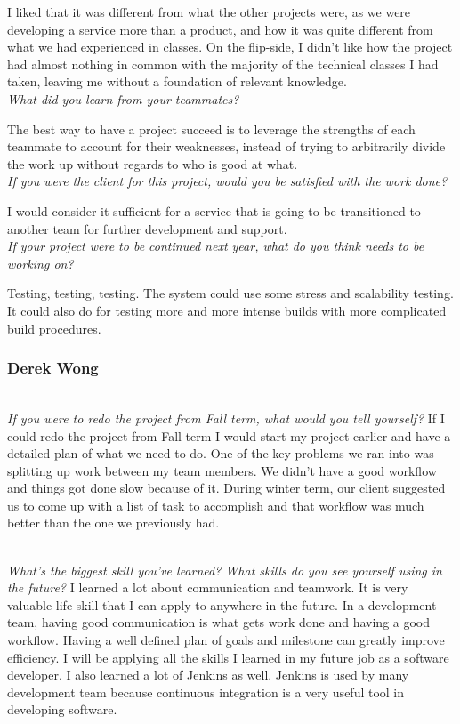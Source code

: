 \documentclass[10pt,letterpaper,onecolumn,draftclsnofoot]{IEEEtran}
\begin{document}
I liked that it was different from what the other projects were, as we were developing a service more than a product, and how it was quite different from what we had experienced in classes. On the flip-side, I didn't like how the project had almost nothing in common with the majority of the technical classes I had taken, leaving me without a foundation of relevant knowledge.
\textit{\\What did you learn from your teammates?}

The best way to have a project succeed is to leverage the strengths of each teammate to account for their weaknesses, instead of trying to arbitrarily divide the work up without regards to who is good at what.
\textit{\\If you were the client for this project, would you be satisfied with the work done?}

I would consider it sufficient for a service that is going to be transitioned to another team for further development and support.
\textit{\\If your project were to be continued next year, what do you think needs to be working on?}

Testing, testing, testing. The system could use some stress and scalability testing. It could also do for testing more and more intense builds with more complicated build procedures.\\

\subsubsection{Derek Wong}
\textit{\\If you were to redo the project from Fall term, what would you tell yourself?}
If I could redo the project from Fall term I would start my project earlier and have a detailed plan of what we need to do. One of the key problems we ran into was splitting up work between my team members. We didn't have a good workflow and things got done slow because of it. During winter term, our client suggested us to come up with a list of task to accomplish and that workflow was much better than the one we previously had.

\textit{\\What's the biggest skill you've learned? What skills do you see yourself using in the future?}
I learned a lot about communication and teamwork. It is very valuable life skill that I can apply to anywhere in the future. In a development team, having good communication is what gets work done and having a good workflow. Having a well defined plan of goals and milestone can greatly improve efficiency. I will be applying all the skills I learned in my future job as a software developer. I also learned a lot of Jenkins as well. Jenkins is used by many development team because continuous integration is a very useful tool in developing software.
\end{document}
